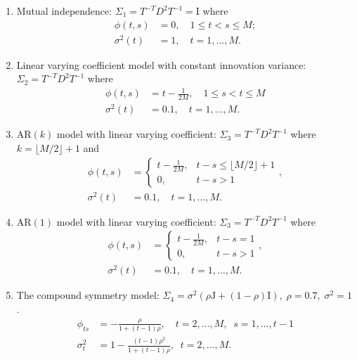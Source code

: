\documentclass[12pt]{article}
\theoremstyle{definition}
\begin{document}
\begin{enumerate} 
\item Mutual independence: $\Sigma_1 = T^{-T} D^2 T^{-1} = \mathrm{I}$ where 
\begin{align*}
\phi\left(t,s\right) &= 0, \quad 1 \le t < s \le M;\\ 
\sigma^2\left(t\right) &= 1, \quad t = 1,\dots, M.
\end{align*}
\item Linear varying coefficient model with constant innovation variance: $\Sigma_2 = T^{-T} D^2 T^{-1}$ where 
\begin{align*}
\phi\left(t,s\right) &= t - \frac{1}{2M}, \quad 1 \le s < t \le M \\
\sigma^2\left(t\right) &= 0.1, \quad t = 1,\dots, M.
\end{align*}
\item $\mbox{AR}\left(k\right)$ model with linear varying coefficient: $\Sigma_3 = T^{-T} D^2 T^{-1}$ where $k = \lfloor M/2\rfloor + 1$ and 
\begin{align*}
\phi\left(t,s\right) &= \left\{\begin{array}{ll} t - \frac{1}{2M}, & t - s \le \lfloor M/2\rfloor + 1\\ 
0, & t - s > 1\end{array}\right.,\\
\sigma^2\left(t\right) &= 0.1, \quad t = 1,\dots, M.
\end{align*}
\item $\mbox{AR}\left(1\right)$ model with linear varying coefficient: $\Sigma_3 = T^{-T} D^2 T^{-1}$ where 
\begin{align*}
\phi\left(t,s\right) &= \left\{\begin{array}{ll} t - \frac{1}{2M}, & t - s = 1\\ 0, & t - s > 1\end{array}\right.,\\
\sigma^2\left(t\right) &= 0.1, \quad t = 1,\dots, M.
\end{align*}
\item The compound symmetry model: $\Sigma_4 = \sigma^2\left(\rho \mathrm{J} + \left(1-\rho\right)\mathrm{I}\right),\; \rho=0.7,\;\sigma^2=1$. 
\begin{align*}
\phi_{ts} &= -\frac{\rho}{1 + \left(t-1\right)\rho}, \quad t = 2, \dots, M,\;\; s = 1, \dots, t-1\\
\sigma_t^2 &= 1 -\frac{\left(t-1\right)\rho^2}{1 + \left(t-1\right)\rho}, \;\; t = 2, \dots, M.
\end{align*}
\end{enumerate}
\end{document}
